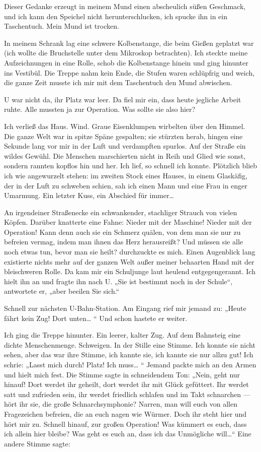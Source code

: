 Dieser Gedanke erzeugt in meinem Mund einen abscheulich süßen
Geschmack, und ich kann den Speichel nicht herunterschlucken, ich
spucke ihn in ein Taschentuch. Mein Mund ist trocken.

In meinem Schrank lag eine schwere Kolbenstange, die beim Gießen
geplatzt war (ich wollte die Bruchstelle unter dem Mikroskop
betrachten). Ich steckte meine Aufzeichnungen in eine Rolle, schob
die Kolbenstange hinein und ging hinunter ins Vestibül. Die Treppe
nahm kein Ende, die Stufen waren schlüpfrig und weich, die ganze
Zeit musste ich mir mit dem Taschentuch den Mund abwischen.

U war nicht da, ihr Platz war leer. Da fiel mir ein, dass heute
jegliche Arbeit ruhte. Alle mussten ja zur Operation. Was sollte
sie also hier?

Ich verließ das Haus. Wind. Graue Eisenklumpen wirbelten über den
Himmel. Die ganze Welt war in spitze Späne gespalten; sie stürzten
herab, hingen eine Sekunde lang vor mir in der Luft und verdampften
spurlos. Auf der Straße ein wildes Gewühl. Die Menschen
marschierten nicht in Reih und Glied wie sonst, sondern rannten
kopflos hin und her. Ich lief, so schnell ich konnte. Plötzlich
blieb ich wie angewurzelt stehen: im zweiten Stock eines Hauses, in
einem Glaskäfig, der in der Luft zu schweben schien, sah ich einen
Mann und eine Frau in enger Umarmung. Ein letzter Kuss, ein
Abschied für immer\ldots{}

An irgendeiner Straßenecke ein schwankender, stachliger Strauch von
vielen Köpfen. Darüber knatterte eine Fahne: Nieder mit der
Maschine! Nieder mit der Operation! Kann denn auch sie ein Schmerz
quälen, von dem man sie nur zu befreien vermag, indem man ihnen das
Herz herausreißt? Und müssen sie alle noch etwas tun, bevor
man sie heilt? durchzuckte es mich. Einen Augenblick lang
existierte nichts mehr auf der ganzen Welt außer meiner behaarten
Hand mit der bleischweren Rolle. Da kam mir ein Schuljunge laut
heulend entgegengerannt. Ich hielt ihn an und fragte ihn nach U.
„Sie ist bestimmt noch in der Schule“, antwortete er, „aber beeilen
Sie sich.“

Schnell zur nächsten U-Bahn-Station. Am Eingang rief mir jemand zu:
„Heute fährt kein Zug! Dort unten\ldots{} “ Und schon hastete er
weiter.

Ich ging die Treppe hinunter. Ein leerer, kalter Zug. Auf dem
Bahnsteig eine dichte Menschenmenge. Schweigen. In der Stille eine
Stimme. Ich konnte sie nicht sehen, aber das war ihre Stimme, ich
kannte sie, ich kannte sie nur allzu gut! Ich schrie: „Lasst mich
durch! Platz! Ich muss\ldots{} “ Jemand packte mich an den Armen und
hielt mich fest. Die Stimme sagte in schneidendem Ton: „Nein, geht
nur hinauf! Dort werdet ihr geheilt, dort werdet ihr mit Glück
gefüttert. Ihr werdet satt und zufrieden sein, ihr werdet friedlich
schlafen und im Takt schnarchen — hört ihr sie, die große
Schnarchsymphonie? Narren, man will euch von allen Fragezeichen
befreien, die an euch nagen wie Würmer. Doch ihr steht hier und
hört mir zu. Schnell hinauf, zur großen Operation! Was kümmert es
euch, dass ich allein hier bleibe? Was geht es euch an, dass ich
das Unmögliche will\ldots{}“ Eine andere Stimme sagte:

